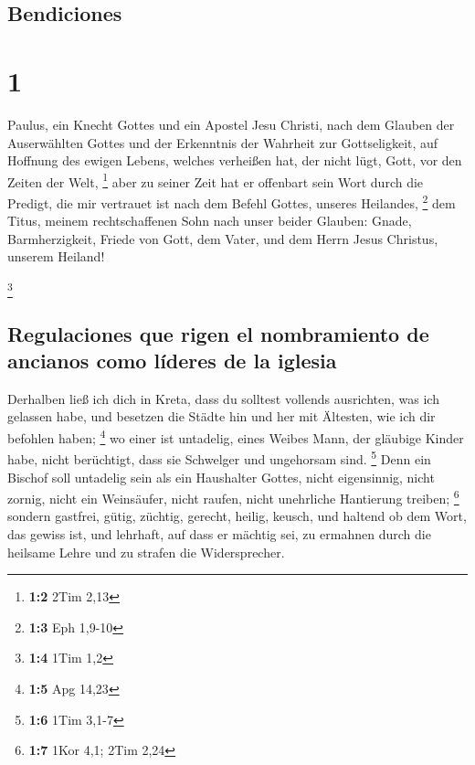 \hypertarget{bendiciones}{%
\subsection{Bendiciones}\label{bendiciones}}

\hypertarget{section}{%
\section{1}\label{section}}

 Paulus, ein Knecht Gottes und ein Apostel Jesu Christi,
nach dem Glauben der Auserwählten Gottes und der Erkenntnis der Wahrheit
zur Gottseligkeit,  auf Hoffnung des ewigen Lebens,
welches verheißen hat, der nicht lügt, Gott, vor den Zeiten der Welt,
\footnote{\textbf{1:2} 2Tim 2,13}  aber zu seiner Zeit hat
er offenbart sein Wort durch die Predigt, die mir vertrauet ist nach dem
Befehl Gottes, unseres Heilandes, \footnote{\textbf{1:3} Eph 1,9-10}
 dem Titus, meinem rechtschaffenen Sohn nach unser beider
Glauben: Gnade, Barmherzigkeit, Friede von Gott, dem Vater, und dem
Herrn Jesus Christus, unserem Heiland!

\footnote{\textbf{1:4} 1Tim 1,2}

\hypertarget{regulaciones-que-rigen-el-nombramiento-de-ancianos-como-luxedderes-de-la-iglesia}{%
\subsection{Regulaciones que rigen el nombramiento de ancianos como
líderes de la
iglesia}\label{regulaciones-que-rigen-el-nombramiento-de-ancianos-como-luxedderes-de-la-iglesia}}

 Derhalben ließ ich dich in Kreta, dass du solltest
vollends ausrichten, was ich gelassen habe, und besetzen die Städte hin
und her mit Ältesten, wie ich dir befohlen haben; \footnote{\textbf{1:5}
  Apg 14,23}  wo einer ist untadelig, eines Weibes Mann,
der gläubige Kinder habe, nicht berüchtigt, dass sie Schwelger und
ungehorsam sind. \footnote{\textbf{1:6} 1Tim 3,1-7}  Denn
ein Bischof soll untadelig sein als ein Haushalter Gottes, nicht
eigensinnig, nicht zornig, nicht ein Weinsäufer, nicht raufen, nicht
unehrliche Hantierung treiben; \footnote{\textbf{1:7} 1Kor 4,1; 2Tim
  2,24}  sondern gastfrei, gütig, züchtig, gerecht,
heilig, keusch,  und haltend ob dem Wort, das gewiss ist,
und lehrhaft, auf dass er mächtig sei, zu ermahnen durch die heilsame
Lehre und zu strafen die Widersprecher.

